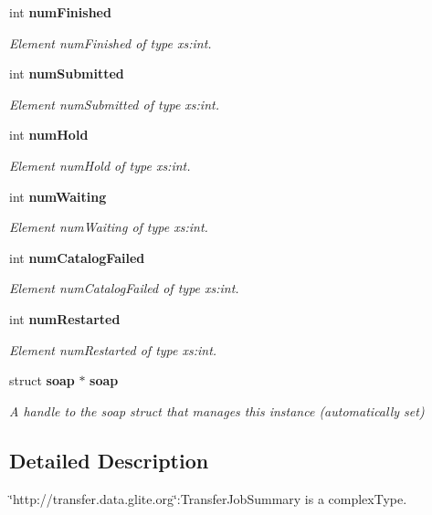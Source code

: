 \begin{DoxyCompactItemize}
int {\bf numFinished}
\begin{DoxyCompactList}\small\item\em Element numFinished of type xs:int. \item\end{DoxyCompactList}\item 
int {\bf numSubmitted}
\begin{DoxyCompactList}\small\item\em Element numSubmitted of type xs:int. \item\end{DoxyCompactList}\item 
int {\bf numHold}
\begin{DoxyCompactList}\small\item\em Element numHold of type xs:int. \item\end{DoxyCompactList}\item 
int {\bf numWaiting}
\begin{DoxyCompactList}\small\item\em Element numWaiting of type xs:int. \item\end{DoxyCompactList}\item 
int {\bf numCatalogFailed}
\begin{DoxyCompactList}\small\item\em Element numCatalogFailed of type xs:int. \item\end{DoxyCompactList}\item 
int {\bf numRestarted}
\begin{DoxyCompactList}\small\item\em Element numRestarted of type xs:int. \item\end{DoxyCompactList}\item 
struct {\bf soap} $\ast$ {\bf soap}\label{classtransfer____TransferJobSummary_a799d3324a2cc9a8bcd8a1c9442eec31d}

\begin{DoxyCompactList}\small\item\em A handle to the soap struct that manages this instance (automatically set) \item\end{DoxyCompactList}\end{DoxyCompactItemize}


\subsection{Detailed Description}
\char`\"{}http://transfer.data.glite.org\char`\"{}:TransferJobSummary is a complexType. 

